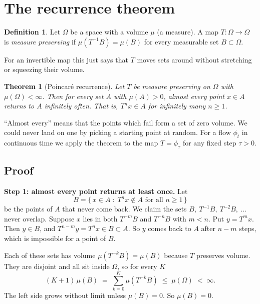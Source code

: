 \documentclass[11pt,a4paper]{article}
\newtheorem{theorem}{Theorem}
\theoremstyle{definition}
\newtheorem{definition}{Definition}
\begin{document}
\section{The recurrence theorem}
\label{sec:theorem}

\begin{definition}
Let $\Omega$ be a space with a volume $\mu$ (a measure). A map $T:\Omega\to\Omega$ is \emph{measure preserving} if $\mu(T^{-1}B) = \mu(B)$ for every measurable set $B \subset \Omega$.
\end{definition}

For an invertible map this just says that $T$ moves sets around without stretching or squeezing their volume.

\begin{theorem}[Poincar\'e recurrence]
Let $T$ be measure preserving on $\Omega$ with $\mu(\Omega) < \infty$. Then for every set $A$ with $\mu(A) > 0$, almost every point $x \in A$ returns to $A$ infinitely often. That is, $T^n x \in A$ for infinitely many $n \ge 1$.
\end{theorem}

``Almost every'' means that the points which fail form a set of zero volume. We could never land on one by picking a starting point at random. For a flow $\phi_t$ in continuous time we apply the theorem to the map $T = \phi_\tau$ for any fixed step $\tau > 0$.

\subsection{Proof}

\textbf{Step 1: almost every point returns at least once.}
Let
\[
B = \{\, x \in A \;:\; T^n x \notin A \text{ for all } n \ge 1 \,\}
\]
be the points of $A$ that never come back. We claim the sets $B,\ T^{-1}B,\ T^{-2}B,\ \dots$ never overlap. Suppose $x$ lies in both $T^{-m}B$ and $T^{-n}B$ with $m < n$. Put $y = T^m x$. Then $y \in B$, and $T^{n-m}y = T^n x \in B \subset A$. So $y$ comes back to $A$ after $n-m$ steps, which is impossible for a point of $B$.

Each of these sets has volume $\mu(T^{-k}B) = \mu(B)$ because $T$ preserves volume. They are disjoint and all sit inside $\Omega$, so for every $K$
\[
(K+1)\,\mu(B) \;=\; \sum_{k=0}^{K} \mu\!\left(T^{-k}B\right) \;\le\; \mu(\Omega) \;<\; \infty .
\]
The left side grows without limit unless $\mu(B) = 0$. So $\mu(B) = 0$.
\end{document}
